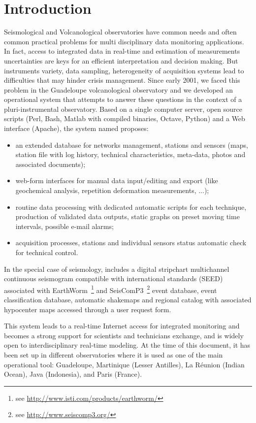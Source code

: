 
\chapter{Introduction}

Seismological and Volcanological observatories have common needs and often common practical problems for multi disciplinary data monitoring applications. In fact, access to integrated data in real-time and estimation of measurements uncertainties are keys for an efficient interpretation and decision making. But instruments variety, data sampling, heterogeneity of acquisition systems lead to difficulties that may hinder crisis management. Since early 2001, we faced this problem in the Guadeloupe volcanological observatory and we developed an operational system that attempts to answer these questions in the context of a pluri-instrumental observatory. Based on a single computer server, open source scripts (Perl, Bash, Matlab with compiled binaries, Octave, Python) and a Web interface (Apache), the system named \webobs proposes:
\begin{itemize}
	\item  an extended database for networks management, stations and sensors (maps, station file with log history, technical characteristics, meta-data, photos and associated documents);
	\item web-form interfaces for manual data input/editing and export (like geochemical analysis, repetition deformation measurements, ...);
	\item routine data processing with dedicated automatic scripts for each technique, production of validated data outputs, static graphs on preset moving time intervals, possible e-mail alarms;
	\item acquisition processes, stations and individual sensors status automatic check for technical control.
\end{itemize}

In the special case of seismology, \webobs includes a digital stripchart multichannel continuous seismogram compatible with international standards (SEED) associated with EarthWorm~\footnote{see \url{http://www.isti.com/products/earthworm/}} and SeisComP3~\footnote{see \url{http://www.seiscomp3.org/}} event database, event classification database, automatic shakemaps and regional catalog with associated hypocenter maps accessed through a user request form.

This system leads to a real-time Internet access for integrated monitoring and becomes a strong support for scientists and technicians exchange, and is widely open to interdisciplinary real-time modeling. At the time of this document, it has been set up in different observatories where it is used as one of the main operational tool: Guadeloupe, Martinique (Lesser Antilles), La Réunion (Indian Ocean), Java (Indonesia), and Paris (France).

